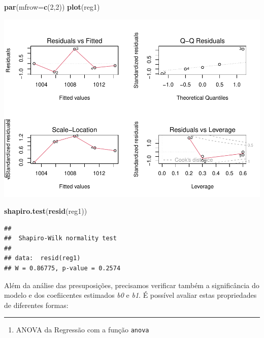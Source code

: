\documentclass[
]{book}
\newenvironment{Shaded}{\begin{snugshade}}{\end{snugshade}}
\newcommand{\AttributeTok}[1]{\textcolor[rgb]{0.13,0.29,0.53}{#1}}
\newcommand{\DecValTok}[1]{\textcolor[rgb]{0.00,0.00,0.81}{#1}}
\newcommand{\FunctionTok}[1]{\textcolor[rgb]{0.13,0.29,0.53}{\textbf{#1}}}
\newcommand{\NormalTok}[1]{#1}
\providecommand{\tightlist}{%
  \setlength{\itemsep}{0pt}\setlength{\parskip}{0pt}}
\begin{document}
\begin{Shaded}
\begin{Highlighting}[]
\FunctionTok{par}\NormalTok{(}\AttributeTok{mfrow=}\FunctionTok{c}\NormalTok{(}\DecValTok{2}\NormalTok{,}\DecValTok{2}\NormalTok{))}
\FunctionTok{plot}\NormalTok{(reg1)}
\end{Highlighting}
\end{Shaded}

\includegraphics{_main_files/figure-latex/pres-1.pdf}

\begin{Shaded}
\begin{Highlighting}[]
\FunctionTok{shapiro.test}\NormalTok{(}\FunctionTok{resid}\NormalTok{(reg1))}
\end{Highlighting}
\end{Shaded}

\begin{verbatim}
## 
##  Shapiro-Wilk normality test
## 
## data:  resid(reg1)
## W = 0.86775, p-value = 0.2574
\end{verbatim}

Além da análise das presuposições, precisamos verificar também a significância do modelo e dos coefiicentes estimados \emph{b0} e \emph{b1}. É possível avaliar estas propriedades de diferentes formas:

\begin{center}\rule{0.5\linewidth}{0.5pt}\end{center}

\begin{enumerate}
\def\labelenumi{\arabic{enumi}.}
\tightlist
\item
  ANOVA da Regressão com a função \texttt{anova}
\end{enumerate}
\end{document}
